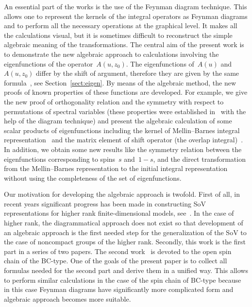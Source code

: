 \documentclass[10pt,a4paper]{amsart}
\numberwithin{equation}{section}
\begin{document}
An essential part of the works \cite{DKM,DM2}
is the use of the Feynman diagram technique.
This allows one to represent the kernels of the integral operators as Feynman diagrams
and to perform all the necessary operations at the graphical level.
It makes all the calculations visual, but it is sometimes difficult to reconstruct the simple algebraic meaning of the transformations.
The central aim of the present work is to demonstrate the new algebraic approach to calculations involving the eigenfunctions of the operator~$A(u,z_0)$.
The eigenfunctions of~$A(u)$ and~$A(u,z_0)$ differ by the shift of argument, therefore they are given by the same formula~\cite{DM2}, see Section~\ref{sect:eigen}.
By means of the algebraic method, the new proofs of known properties of these functions are developed.
For example, we give the new proof of orthogonality relation and the symmetry with respect to permutations of spectral variables (these properties were established in~\cite{DKO,DM2} with the help of the diagram technique)
and present the algebraic calculation of some scalar products of eigenfunctions including the kernel of Mellin--Barnes integral representation~\cite{Val20} and the matrix element of shift operator (the overlap integral)~\cite{DMV2}.
In addition, we obtain some new results like the symmetry relation between the eigenfunctions corresponding to spins~$s$ and~$1-s$, and the direct transformation from the Mellin--Barnes representation to the initial integral representation without using the completeness of the set of eigenfunctions.

Our motivation for developing the algebraic approach is twofold.
First of all, in recent years significant progress has been made in constructing SoV representations for higher rank finite-dimensional models, see~\cite{Cavaglia:2019pow,GromovRyan20,GromovSizov17,Gromov:2022waj,Levk,MailletNiccoli18,
MR3983970,MailletNiccoli19,Maillet:2020ykb,Ryan:2021duf,RyanVolin19,
Ryan:2020rfk}.
In the case of higher rank, the diagrammatical approach does not exist
so that development of an algebraic approach is the first needed step for the generalization of the SoV to the case of noncompact groups of the higher rank.
Secondly, this work is the first part in a series of two papers.
The second work~\cite{ADV2} is devoted to the open spin chain of the BC-type.
One of the goals of the present paper is to collect all formulas needed
for the second part and derive them in a unified way.
This allows to perform similar calculations in the case of the spin chain
of BC-type because in this case Feynman diagrams have significantly more
complicated form and algebraic approach becomes more suitable.
\end{document}
